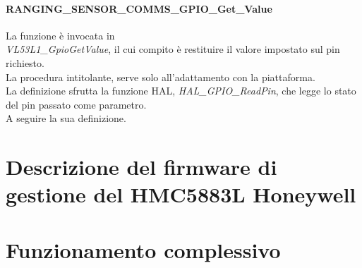 \paragraph{RANGING\_SENSOR\_COMMS\_GPIO\_Get\_Value}
La funzione è invocata in\\\textit{VL53L1\_GpioGetValue}, il cui compito è restituire il valore impostato sul pin richiesto.\\
La procedura intitolante, serve solo all'adattamento con la piattaforma.\\
La definizione sfrutta la funzione HAL, \textit{HAL\_GPIO\_ReadPin}, che legge lo stato del pin passato come parametro.\\
A seguire la sua definizione.


\section{Descrizione del firmware di gestione del HMC5883L Honeywell}
\section{Funzionamento complessivo}